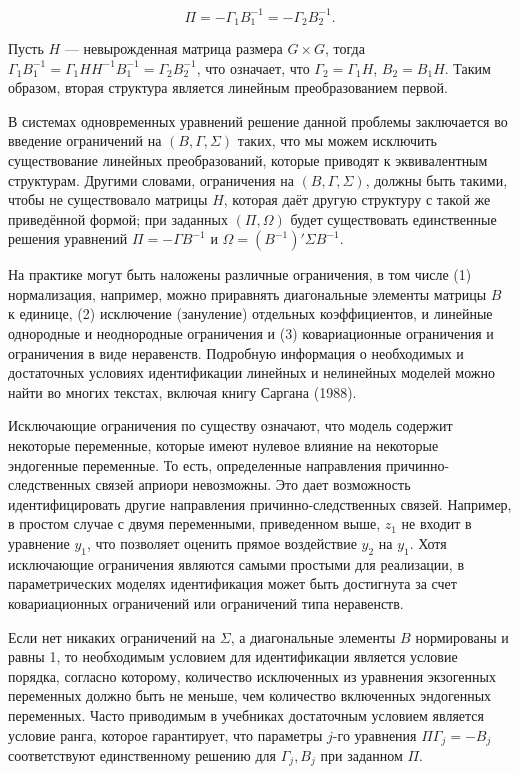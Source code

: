 \begin{equation}
\Pi=-\Gamma_{1} B^{-1}_{1}=-\Gamma_{2} B^{-1}_{2}.
\end{equation}


Пусть $H$ --- невырожденная  матрица размера $G \times G$, тогда
$\Gamma_{1} B^{-1}_{1}=\Gamma_{1} H H^{-1} B^{-1}_{1}=\Gamma_{2} B^{-1}_{2}$, что означает, что $\Gamma_{2}=\Gamma_{1}H$, $B_{2}=B_{1}H$. Таким образом, вторая структура является линейным преобразованием первой.


В системах одновременных уравнений решение данной проблемы заключается во введение ограничений на $(B,\Gamma,\Sigma)$ таких, что мы можем исключить существование линейных преобразований, которые приводят к  эквивалентным структурам. Другими словами, ограничения на $(B,\Gamma,\Sigma)$, должны быть такими, чтобы не существовало матрицы $H$, которая даёт другую структуру с такой же приведённой формой; при заданных $(\Pi,\Omega)$ будет существовать единственные решения уравнений $\Pi=-\Gamma B^{-1}$ и $\Omega=(B^{-1})'\Sigma B^{-1}$.
	
	
На практике могут быть наложены различные ограничения, в том числе (1) нормализация, например, можно приравнять диагональные элементы матрицы $B$ к единице, (2) исключение (зануление) отдельных коэффициентов, и линейные однородные и неоднородные ограничения и (3) ковариационные ограничения и ограничения в виде неравенств.  Подробную информация о необходимых и достаточных условиях  идентификации  линейных и нелинейных моделей можно найти во многих текстах, включая книгу Саргана (1988).
	
	
Исключающие ограничения по существу означают, что модель содержит некоторые переменные, которые имеют нулевое влияние на некоторые эндогенные переменные. То есть, определенные направления причинно-следственных связей априори невозможны. Это дает возможность идентифицировать другие направления причинно-следственных связей. Например, в простом случае с двумя переменными, приведенном выше, $z_{1}$ не входит в уравнение $y_{1}$, что позволяет оценить  прямое воздействие $y_{2}$ на $y_{1}$. Хотя исключающие ограничения являются самыми простыми для реализации, в параметрических моделях идентификация может быть достигнута за счет ковариационных ограничений или ограничений типа неравенств.
	
	
Если нет никаких ограничений на $\Sigma$, а диагональные элементы $B$ нормированы и равны 1, то необходимым условием для идентификации является условие порядка, согласно которому, количество исключенных из уравнения экзогенных переменных должно быть не меньше, чем  количество включенных эндогенных переменных. Часто приводимым в учебниках достаточным условием является условие ранга, которое гарантирует, что  параметры $j$-го уравнения $\Pi \Gamma_{j}=-B_{j}$ соответствуют единственному решению для $\Gamma_{j},B_{j}$ при заданном $\Pi$.

